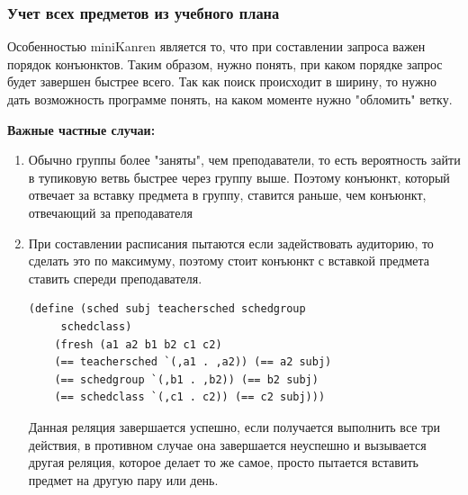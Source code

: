 \subsubsection{Учет всех предметов из учебного плана}
Особенностью miniKanren является то, что при составлении запроса важен порядок конъюнктов.
Таким образом, нужно понять, при каком порядке запрос будет завершен быстрее всего. Так как поиск происходит в ширину, то нужно дать возможность программе понять, на каком моменте нужно "обломить" ветку.

\textbf{Важные частные случаи:}
\begin{enumerate}
    \item Обычно группы более "заняты", чем преподаватели, то есть вероятность зайти в тупиковую ветвь быстрее через группу выше. Поэтому конъюнкт, который отвечает за вставку предмета в группу, ставится раньше, чем конъюнкт, отвечающий за преподавателя
    \item При составлении расписания пытаются если задействовать аудиторию, то сделать это по максимуму, поэтому стоит конъюнкт с вставкой предмета ставить спереди преподавателя. 
   \begin{lstlisting}[caption=Использование унификации для вставки 4 пары, language=OCaml, frame=single]
    (define (sched subj teachersched schedgroup
     schedclass)
    (fresh (a1 a2 b1 b2 c1 c2)
    (== teachersched `(,a1 . ,a2)) (== a2 subj)
    (== schedgroup `(,b1 . ,b2)) (== b2 subj)
    (== schedclass `(,c1 . c2)) (== c2 subj)))
\end{lstlisting}
    Данная реляция завершается успешно, если получается выполнить все три действия, в противном случае она завершается неуспешно и вызывается другая реляция, которое делает то же самое, просто пытается вставить предмет на другую пару или день.
\end{enumerate}


